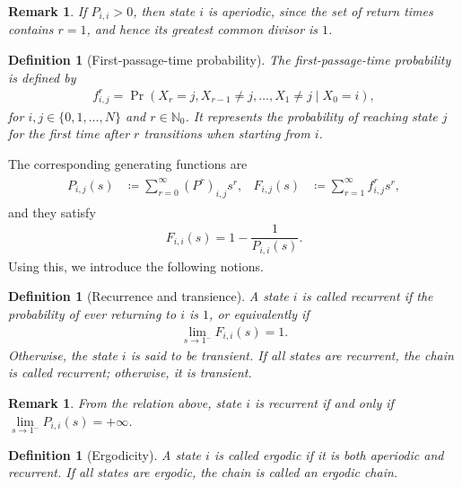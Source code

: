 \documentclass[11pt]{amsart}
\theoremstyle{plain}
\newtheorem{defi}[teo]{Definition}
\newtheorem{rem}[teo]{Remark}
\newcommand{\N}{\mathbb{N}}
\newcommand{\1}{\text{\fontseries{bx}\selectfont \textup 1}}
\begin{document}
\begin{rem}
	\label{condicionsuficienteaperiodicidad}
	If $P_{i,i}>0$, then state $i$ is aperiodic, since the set of return times contains $r=1$, and hence its greatest common divisor is $1$.
\end{rem}

\begin{defi}[First-passage-time probability]
	The {first-passage-time probability} is defined by
	\begin{align*}
		f^r_{i,j}=\Pr(X_{r}=j,X_{r-1}\neq j,\ldots ,X_{1}\neq j\mid X_{0}=i),
	\end{align*}
	for $i,j\in\{0,1,\ldots,N\}$ and $r\in\N_0$. It represents the probability of reaching state $j$ for the first time after $r$ transitions when starting from $i$.
\end{defi}

The corresponding generating functions are
\begin{align*}
	\begin{aligned}
		P_{i,j}(s)&\coloneq \sum_{r=0}^\infty (P^r)_{i,j}s^r, &
		F_{i,j}(s)&\coloneq \sum_{r=1}^\infty f^r_{i,j}s^r,
	\end{aligned}
\end{align*}
and they satisfy
\begin{align*}
	F_{i,i}(s)=1-\dfrac{1}{P_{i,i}(s)}.
\end{align*}
Using this, we introduce the following notions.

\begin{defi}[Recurrence and transience]
	\label{defrecurrente}
	A state $i$ is called {recurrent} if the probability of ever returning to $i$ is $1$, or equivalently if
	\begin{align*}
		\lim_{s\rightarrow1^{-}}F_{i,i}(s)=1.
	\end{align*}
	Otherwise, the state $i$ is said to be {transient}. If all states are recurrent, the chain is called recurrent; otherwise, it is transient.
\end{defi}

\begin{rem}
	\label{condicionsuficienteparalarecurrencia}
	From the relation above, state $i$ is recurrent if and only if $\lim\limits_{s\rightarrow1^{-}}P_{i,i}(s)=+\infty$.
\end{rem}

\begin{defi}[Ergodicity]
	\label{defergodico}
	A state $i$ is called {ergodic} if it is both aperiodic and recurrent. If all states are ergodic, the chain is called an ergodic chain.
\end{defi}
\end{document}
